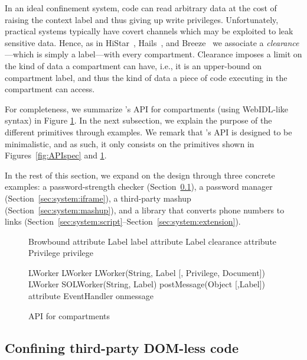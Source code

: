 In an ideal confinement system, code can read arbitrary data at the
cost of raising the context label and thus giving up write privileges.
%
Unfortunately, practical systems typically have covert channels which
may be exploited to leak sensitive data.
%
Hence, as in HiStar~\cite{Zeldovich:2006}, Hails~\cite{giffin:2012:hails}, and
Breeze~\cite{Breeze13} we associate a \emph{clearance}---which is
simply a label---with every compartment.
%
Clearance imposes a limit on the kind of data a compartment can have,
i.e., it is an upper-bound on compartment label, and thus the kind of
data a piece of code executing in the compartment can access.

For completeness, we summarize  \sys{}'s API for compartments
(using WebIDL-like syntax) in Figure \ref{systemAPI}. In the next subsection, 
we explain the purpose of the different primitives through examples. 
We remark that \sys{}'s API is designed to be minimalistic, and as such, it only
consists on the primitives shown in Figures~\ref{fig:APIspec} and
\ref{systemAPI}.

In the rest of this section, we expand on the \sys{} design through
three concrete examples: 
a password-strength checker (Section~\ref{sec:system:worker}),
a password manager (Section~\ref{sec:system:iframe}), 
a third-party mashup (Section~\ref{sec:system:mashup}), and
a library that converts phone numbers to links
(Section~\ref{sec:system:script}--Section~\ref{sec:system:extension}).
%


\begin{figure}
{\small
\begin{webidl}
Browbound {
  attribute Label label
  attribute Label clearance 
  attribute Privilege privilege
}
\end{webidl}
\begin{webidl}
LWorker {
  LWorker LWorker(String, Label
                  [, Privilege, Document])
  LWorker SOLWorker(String, Label)
  postMessage(Object [,Label])
  attribute EventHandler onmessage
}
\end{webidl}
}
\caption{\label{systemAPI} API for compartments}
\end{figure}


\subsection{Confining third-party DOM-less code}
\label{sec:system:worker}

